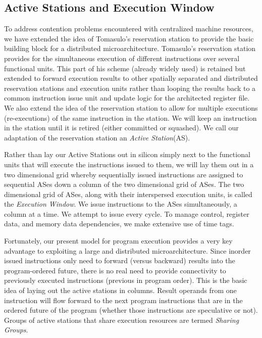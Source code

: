 \documentclass[10pt,twocolumn,dvips]{article}
\begin{document}
\subsection{Active Stations and Execution Window}
\vspace{-0.1in}
To address contention problems encountered with centralized
machine resources, we have extended the idea of Tomasulo's reservation
station \cite{Tom67} to provide the basic building block for a distributed
microarchitecture.  Tomasulo's reservation station provides for the
simultaneous execution of different instructions over several
functional units.  This part of his scheme (already widely used) is
retained but extended to forward execution results to other spatially
separated and distributed reservation stations and execution units
rather than looping the results back to a common instruction issue unit
and update logic for the architected register file.  We also extend the idea
of the reservation station to allow for multiple executions (re-executions)
of the same instruction in the station.  We will keep an 
instruction in the station until it is retired (either committed or 
squashed).  
We call our adaptation of the reservation station an 
{\em Active Station}(AS).  

Rather than lay our Active Stations out in silicon simply next to
the functional units that will execute the instructions issued to them,
we will lay them out in a two dimensional grid whereby sequentially
issued instructions are assigned to sequential ASes down a column of
the two dimensional grid of ASes.  The two dimensional
grid of ASes, along with their interspersed execution units,
is called the {\em Execution Window}.
We issue instructions to the ASes simultaneously, a column at
a time.  We attempt to issue every cycle.
To manage control, register data, and memory
data dependencies, we make extensive use of time tags.

Fortunately, our present model for program execution provides
a very key advantage to exploiting a large and distributed microarchitecture.
Since inorder issued instructions 
only need to forward (versus backward) results into the
program-ordered future, there is no real need to provide connectivity
to previously executed instructions 
(previous in program order).  This is the basic
idea of laying out the active stations in columns.  Result operands
from one instruction will flow forward to the next program instructions
that are in the ordered future of the program (whether those
instructions are speculative or not).  
Groups of active stations
that share execution resources are termed \textit{Sharing Groups}.
\vspace{-0.2in}
\end{document}
